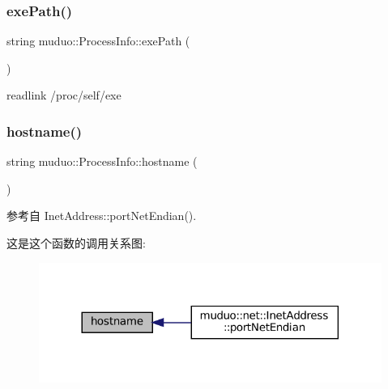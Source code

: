 \subsubsection{\texorpdfstring{exe\+Path()}{exePath()}}
{\footnotesize\ttfamily string muduo\+::\+Process\+Info\+::exe\+Path (\begin{DoxyParamCaption}{ }\end{DoxyParamCaption})}



readlink /proc/self/exe 

\mbox{\label{namespacemuduo_1_1ProcessInfo_ac60f3a33a07318aa231cc3d07f6ee419}} 
\subsubsection{\texorpdfstring{hostname()}{hostname()}}
{\footnotesize\ttfamily string muduo\+::\+Process\+Info\+::hostname (\begin{DoxyParamCaption}{ }\end{DoxyParamCaption})}



参考自 Inet\+Address\+::port\+Net\+Endian().

这是这个函数的调用关系图\+:
\nopagebreak
\begin{figure}[H]
\begin{center}
\leavevmode
\includegraphics[width=317pt]{namespacemuduo_1_1ProcessInfo_ac60f3a33a07318aa231cc3d07f6ee419_icgraph}
\end{center}
\end{figure}
\mbox{\label{namespacemuduo_1_1ProcessInfo_aabe41272bf5623d260fe92399071ed4e}} 
